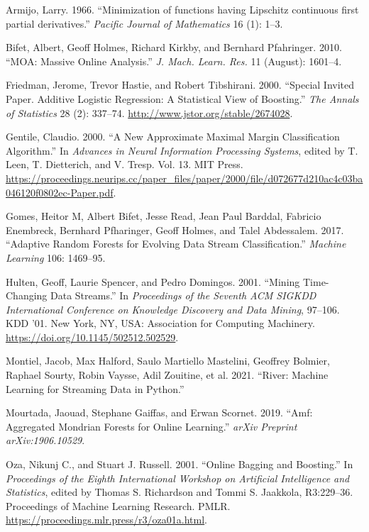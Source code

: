 \documentclass[
]{article}
\newlength{\cslhangindent}
\newlength{\cslentryspacingunit} %
\newenvironment{CSLReferences}[2] %
 {%
  \setlength{\parindent}{0pt}
  \ifodd #1
  \let\oldpar\par
  \def\par{\hangindent=\cslhangindent\oldpar}
  \fi
  \setlength{\parskip}{#2\cslentryspacingunit}
 }%
 {}
\begin{document}
\hypertarget{refs}{}
\begin{CSLReferences}{1}{0}
\leavevmode{}%
Armijo, Larry. 1966. {``{Minimization of functions having Lipschitz
continuous first partial derivatives.}''} \emph{Pacific Journal of
Mathematics} 16 (1): 1--3.

\leavevmode{}%
Bifet, Albert, Geoff Holmes, Richard Kirkby, and Bernhard Pfahringer.
2010. {``MOA: Massive Online Analysis.''} \emph{J. Mach. Learn. Res.} 11
(August): 1601--4.

\leavevmode{}%
Friedman, Jerome, Trevor Hastie, and Robert Tibshirani. 2000. {``Special
Invited Paper. Additive Logistic Regression: A Statistical View of
Boosting.''} \emph{The Annals of Statistics} 28 (2): 337--74.
\url{http://www.jstor.org/stable/2674028}.

\leavevmode{}%
Gentile, Claudio. 2000. {``A New Approximate Maximal Margin
Classification Algorithm.''} In \emph{Advances in Neural Information
Processing Systems}, edited by T. Leen, T. Dietterich, and V. Tresp.
Vol. 13. MIT Press.
\url{https://proceedings.neurips.cc/paper_files/paper/2000/file/d072677d210ac4c03ba046120f0802ec-Paper.pdf}.

\leavevmode{}%
Gomes, Heitor M, Albert Bifet, Jesse Read, Jean Paul Barddal, Fabricio
Enembreck, Bernhard Pfharinger, Geoff Holmes, and Talel Abdessalem.
2017. {``Adaptive Random Forests for Evolving Data Stream
Classification.''} \emph{Machine Learning} 106: 1469--95.

\leavevmode{}%
Hulten, Geoff, Laurie Spencer, and Pedro Domingos. 2001. {``Mining
Time-Changing Data Streams.''} In \emph{Proceedings of the Seventh ACM
SIGKDD International Conference on Knowledge Discovery and Data Mining},
97--106. KDD '01. New York, NY, USA: Association for Computing
Machinery. \url{https://doi.org/10.1145/502512.502529}.

\leavevmode{}%
Montiel, Jacob, Max Halford, Saulo Martiello Mastelini, Geoffrey
Bolmier, Raphael Sourty, Robin Vaysse, Adil Zouitine, et al. 2021.
{``River: Machine Learning for Streaming Data in Python.''}

\leavevmode{}%
Mourtada, Jaouad, Stephane Gaiffas, and Erwan Scornet. 2019. {``Amf:
Aggregated Mondrian Forests for Online Learning.''} \emph{arXiv Preprint
arXiv:1906.10529}.

\leavevmode{}%
Oza, Nikunj C., and Stuart J. Russell. 2001. {``Online Bagging and
Boosting.''} In \emph{Proceedings of the Eighth International Workshop
on Artificial Intelligence and Statistics}, edited by Thomas S.
Richardson and Tommi S. Jaakkola, R3:229--36. Proceedings of Machine
Learning Research. PMLR.
\url{https://proceedings.mlr.press/r3/oza01a.html}.

\end{CSLReferences}
\end{document}
